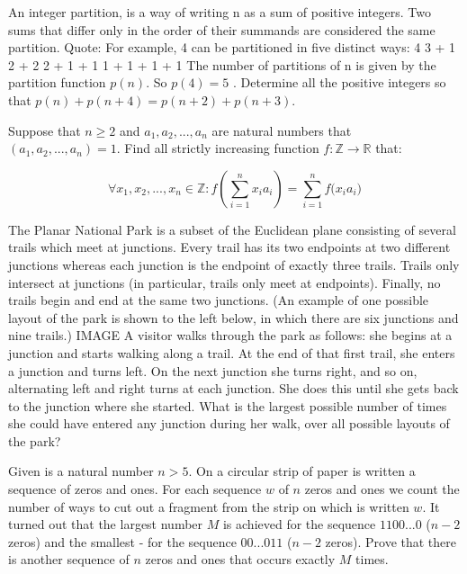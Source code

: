\documentclass[11pt]{scrartcl}
\begin{document}
\begin{problem}[308477537052879]
An integer partition, is a way of writing n as a sum of positive integers. Two sums that differ only in the order of their summands are considered the same partition.
Quote:
For example, 4 can be partitioned in five distinct ways:
4
3 + 1
2 + 2
2 + 1 + 1
1 + 1 + 1 + 1
The number of partitions of n is given by the partition function $p\left ( n \right )$. So $p\left ( 4 \right ) = 5$ .
Determine all the positive integers so that $p\left ( n \right )+p\left ( n+4 \right )=p\left ( n+2 \right )+p\left ( n+3 \right )$.
\end{problem}
\begin{problem}[310023852328572]
Suppose that $n\ge2$ and $a_1,a_2,...,a_n$ are natural numbers that $ (a_1,a_2,...,a_n)=1$. Find all strictly increasing function $f: \mathbb{Z}  \to \mathbb{R} $ that:

$$ \forall  x_1,x_2,...,x_n \in  \mathbb{Z} :       f(\sum_{i=1}^{n} {x_ia_i}) = \sum_{i=1}^{n} {f(x_ia_i})$$
\end{problem}
\begin{problem}[313143209359080]
The Planar National Park is a subset of the Euclidean plane consisting of several trails which meet at junctions. Every trail has its two endpoints at two different junctions whereas each junction is the endpoint of exactly three trails. Trails only intersect at junctions (in particular, trails only meet at endpoints). Finally, no trails begin and end at the same two junctions. (An example of one possible layout of the park is shown to the left below, in which there are six junctions and nine trails.)
IMAGE 
A visitor walks through the park as follows: she begins at a junction and starts walking along a trail. At the end of that first trail, she enters a junction and turns left. On the next junction she turns right, and so on, alternating left and right turns at each junction. She does this until she gets back to the junction where she started. What is the largest possible number of times she could have entered any junction during her walk, over all possible layouts of the park?
\end{problem}
\begin{problem}[314213229221479]
	Given is a natural number $n > 5$. On a circular strip of paper is written a sequence of zeros and ones. For each sequence $w$ of $n$ zeros and ones we count the number of ways to cut out a fragment from the strip on which is written $w$. It turned out that the largest number $M$ is achieved for the sequence $11 00...0$ ($n-2$ zeros) and the smallest - for the sequence $00...011$ ($n-2$ zeros). Prove that there is another sequence of $n$ zeros and ones that occurs exactly $M$ times.
\end{problem}
\end{document}
